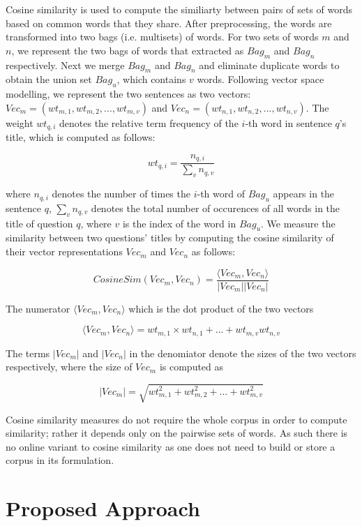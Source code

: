 \documentclass[journal,12pt,onecolumn,draftclsnofoot,]{IEEEtran}
\begin{document}

Cosine similarity is used to compute the similiarty between pairs of sets of words based on common words that they share. After preprocessing, the words are transformed into two bags (i.e. multisets) of words. For two sets of words $m$ and $n$, we represent the two bags of words that extracted as $Bag_m$ and $Bag_n$ respectively. Next we merge $Bag_m$ and $Bag_n$ and eliminate duplicate words to obtain the union set $Bag_u$, which contains $v$ words.  Following vector space modelling, we represent the two sentences as two vectors: $Vec_m = (wt_{m,1}, wt_{m, 2}, ..., wt_{m, v})$ and $Vec_n = (wt_{n,1}, wt_{n, 2}, ..., wt_{n, v})$. The weight $wt_{q, i}$  denotes the relative term frequency of the $i$-th word in sentence $q$'s title, which is computed as follows:

$$ wt_{q, i} = \frac{n_{q, i}}{\sum_v n_{q, v}} $$

where $n_{q, i}$ denotes the number of times the $i$-th word of $Bag_u$ appears in the sentence $q$, $\sum_v n_{q,v}$ denotes the total number of occurences of all words in the title of question $q$, where $v$ is the index of the word in $Bag_u$. We measure the similarity between two questions' titles by computing the cosine similarity of their vector representations $Vec_m$ and $Vec_n$ as follows:

$$ CosineSim(Vec_m, Vec_n) = \frac{\langle Vec_m,  Vec_n \rangle}{|Vec_m| | Vec_n| }$$

The numerator $\langle Vec_m , Vec_n \rangle$ which is the dot product of the two vectors 

$$ \langle Vec_m , Vec_n \rangle  = wt_{m, 1} \times wt_{n, 1} + ... + wt_{m, v} wt_{n, v} $$

The terms $|Vec_m|$ and $|Vec_n|$ in the denomiator denote the sizes of the two vectors respectively, where the size of $Vec_m$ is computed as 

$$ | Vec_m  | = \sqrt{wt_{m,1}^2 + wt_{m,2}^2 + ... + wt_{m,v}^2} $$

Cosine similarity measures do not require the whole corpus in order to compute similarity; rather it depends only on the pairwise sets of words. As such there is no online variant to cosine similarity as one does not need to build or store a corpus in its formulation.

\section{Proposed Approach}
\end{document}
